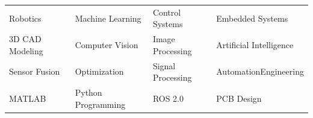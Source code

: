 \documentclass[a4paper]{article}
\begin{document}
\noindent
\begin{tabularx}{\textwidth}{|>{\centering\arraybackslash}X|>{\centering\arraybackslash}X|>{\centering\arraybackslash}X|>{\centering\arraybackslash}X|}

    Robotics & Machine Learning & Control Systems & Embedded Systems \\ 
    3D CAD Modeling & Computer Vision & Image Processing & Artificial Intelligence \\ 
    Sensor Fusion & Optimization & Signal Processing & AutomationEngineering \\ 
    MATLAB & Python Programming & ROS 2.0 & PCB Design \\ 
\end{tabularx}



    
\end{document}
